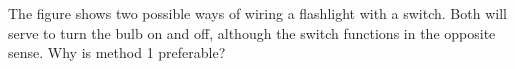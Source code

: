 The figure shows two possible ways of wiring a flashlight
        with a switch. Both will serve to turn the bulb on and off,
        although the switch functions in the opposite sense.  Why is
        method 1 preferable?
